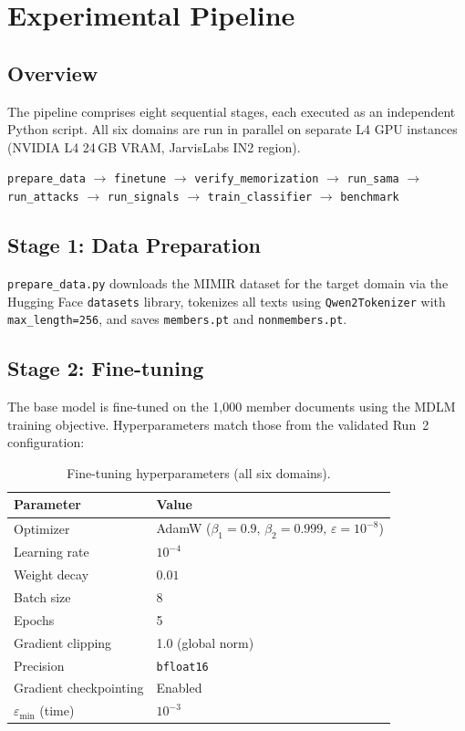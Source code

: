 \documentclass[11pt,a4paper]{article}
\begin{document}
\section{Experimental Pipeline}

\subsection{Overview}

The pipeline comprises eight sequential stages, each executed as an independent
Python script. All six domains are run in parallel on separate L4 GPU instances
(NVIDIA L4 24\,GB VRAM, JarvisLabs IN2 region).

\begin{center}
\texttt{prepare\_data} $\to$ \texttt{finetune} $\to$ \texttt{verify\_memorization} $\to$
\texttt{run\_sama} $\to$ \texttt{run\_attacks} $\to$ \texttt{run\_signals} $\to$
\texttt{train\_classifier} $\to$ \texttt{benchmark}
\end{center}

\subsection{Stage 1: Data Preparation}
\label{sec:prepare}

\texttt{prepare\_data.py} downloads the MIMIR dataset for the target domain via
the Hugging Face \texttt{datasets} library, tokenizes all texts using
\texttt{Qwen2Tokenizer} with \texttt{max\_length=256}, and saves
\texttt{members.pt} and \texttt{nonmembers.pt}.

\subsection{Stage 2: Fine-tuning}
\label{sec:finetune}

The base model is fine-tuned on the 1{,}000 member documents using the MDLM
training objective. Hyperparameters match those from the validated Run~2
configuration:

\begin{table}[H]
\centering
\caption{Fine-tuning hyperparameters (all six domains).}
\begin{tabular}{ll}
\toprule
\textbf{Parameter} & \textbf{Value} \\
\midrule
Optimizer          & AdamW ($\beta_1=0.9,\, \beta_2=0.999,\, \varepsilon=10^{-8}$) \\
Learning rate      & $10^{-4}$ \\
Weight decay       & $0.01$ \\
Batch size         & 8 \\
Epochs             & 5 \\
Gradient clipping  & 1.0 (global norm) \\
Precision          & \texttt{bfloat16} \\
Gradient checkpointing & Enabled \\
$\varepsilon_{\min}$ (time) & $10^{-3}$ \\
\bottomrule
\end{tabular}
\end{table}
\end{document}
